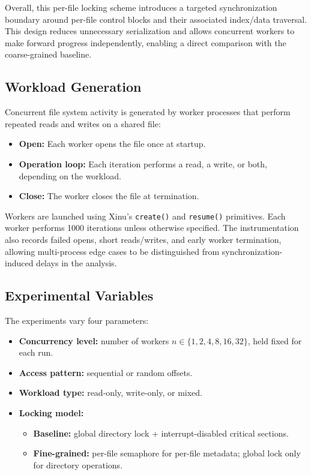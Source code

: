 \documentclass[sigconf]{acmart}
\begin{document}
Overall, this per-file locking scheme introduces a targeted
synchronization boundary around per-file control blocks and their associated index/data traversal. This design reduces unnecessary serialization and allows concurrent workers to make forward progress independently, enabling a direct comparison with the coarse-grained baseline.




\subsection{Workload Generation}

Concurrent file system activity is generated by worker processes that perform repeated reads and writes on a shared file:

\begin{itemize}
    \item \textbf{Open:} Each worker opens the file once at startup.
    \item \textbf{Operation loop:} Each iteration performs a read, a write, or both, depending on the workload.
    \item \textbf{Close:} The worker closes the file at termination.
\end{itemize}

Workers are launched using Xinu's \texttt{create()} and \texttt{resume()} primitives. Each worker performs 1000 iterations unless otherwise specified. The instrumentation also records failed opens, short reads/writes, and early worker termination, allowing multi-process edge cases to be distinguished from synchronization-induced delays in the analysis.


\subsection{Experimental Variables}

The experiments vary four parameters:
\begin{itemize}
    \item \textbf{Concurrency level:} number of workers $n \in \{1, 2, 4, 8, 16, 32\}$, held fixed for each run.
    \item \textbf{Access pattern:} sequential or random offsets.
    \item \textbf{Workload type:} read-only, write-only, or mixed.
    \item \textbf{Locking model:}
    \begin{itemize}
        \item \textbf{Baseline:} global directory lock +
        interrupt-disabled critical sections.
        \item \textbf{Fine-grained:} per-file semaphore for per-file metadata; global lock only for directory operations.
    \end{itemize}
\end{itemize}
\end{document}
